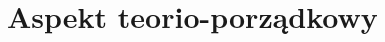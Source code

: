 \documentclass[12pt,a4paper,oneside,leqno,titlepage]{report}
\theoremstyle{definition}
\begin{document}


\part{Aspekt teorio-porządkowy}









%




%
%
%
%





\printindex[names]

\listoffigures
{}


\label{end}
\end{document}
